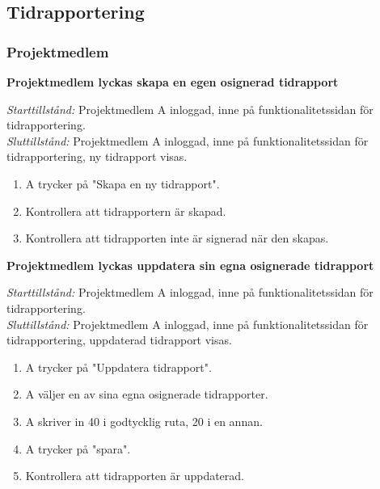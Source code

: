 \documentclass[a4paper]{article}
\begin{document}

\subsection{Tidrapportering}

\subsubsection{Projektmedlem}

\begin{FT}


\item
\textbf{Projektmedlem lyckas skapa en egen osignerad tidrapport}

\emph{Starttillstånd:} Projektmedlem A inloggad, inne på funktionalitetssidan för tidrapportering.\\
\emph{Sluttillstånd:} Projektmedlem A inloggad, inne på funktionalitetssidan för tidrapportering, ny tidrapport visas.

\begin{enumerate}
\item A trycker på "Skapa en ny tidrapport".
\item Kontrollera att tidrapportern är skapad.
\item Kontrollera att tidrapporten inte är signerad när den skapas.
\end{enumerate}

\item
\textbf{Projektmedlem lyckas uppdatera sin egna osignerade tidrapport}

\emph{Starttillstånd:} Projektmedlem A inloggad, inne på funktionalitetssidan för tidrapportering.\\
\emph{Sluttillstånd:} Projektmedlem A inloggad, inne på funktionalitetssidan för tidrapportering, uppdaterad tidrapport visas.

\begin{enumerate}
\item A trycker på "Uppdatera tidrapport".
\item A väljer en av sina egna osignerade tidrapporter.
\item A skriver in 40 i godtycklig ruta, 20 i en annan.
\item A trycker på "spara".
\item Kontrollera att tidrapporten är uppdaterad.
\end{enumerate}


\end{FT}
\end{document}

